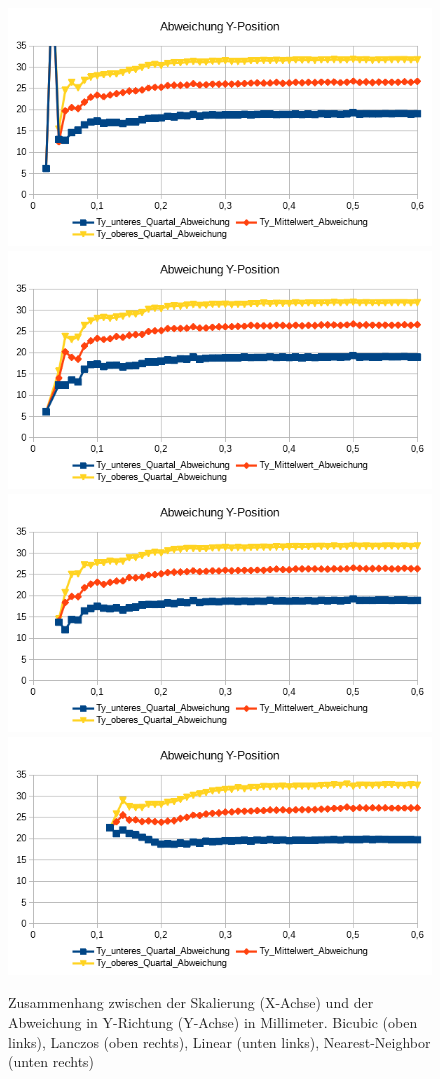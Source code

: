 \begin{figure}
	\centering
	\includegraphics[width=0.45\linewidth]{tabelle2/Y_Pos_Cubic}
	\includegraphics[width=0.45\linewidth]{tabelle2/Y_Pos_Lanc}
	\includegraphics[width=0.45\linewidth]{tabelle2/Y_Pos_Linear}
	\includegraphics[width=0.45\linewidth]{tabelle2/Y_Pos_NN}
	\caption{Zusammenhang zwischen der Skalierung (X-Achse) und der Abweichung in Y-Richtung (Y-Achse) in Millimeter. 
		Bicubic (oben links), Lanczos (oben rechts), Linear (unten links), Nearest-Neighbor (unten rechts)}
	\label{img_Y_Pos_Skal}
\end{figure}
